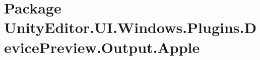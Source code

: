 \hypertarget{namespace_unity_editor_1_1_u_i_1_1_windows_1_1_plugins_1_1_device_preview_1_1_output_1_1_apple}{}\section{Package Unity\+Editor.\+U\+I.\+Windows.\+Plugins.\+Device\+Preview.\+Output.\+Apple}
\label{namespace_unity_editor_1_1_u_i_1_1_windows_1_1_plugins_1_1_device_preview_1_1_output_1_1_apple}
